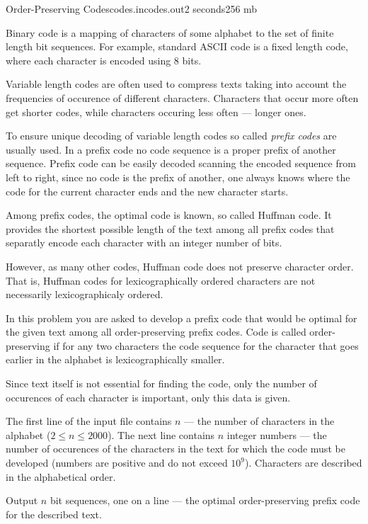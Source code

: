 \begin{problem}{Order-Preserving Codes}{codes.in}{codes.out}{2 seconds}{256 mb}


Binary code is a mapping of characters of some alphabet to the set of
finite length bit sequences. For example, standard ASCII code is a fixed 
length code, where each character is encoded using 8 bits.

Variable length codes are often used to compress texts taking
into account the frequencies of occurence of different characters.
Characters that occur more often get shorter codes, while characters
occuring less often --- longer ones.

To ensure unique decoding of variable length codes so called
\emph{prefix codes} are usually used. In a prefix code no code
sequence is a proper prefix of another sequence. Prefix code
can be easily decoded scanning the encoded sequence from left to
right, since no code is the prefix of another, one always knows
where the code for the current character ends and the new character
starts.

Among prefix codes, the optimal code is known, so called 
Huffman code. It provides the shortest possible length of the 
text among all prefix codes that separatly encode each 
character with an integer number of bits.

However, as many other codes, Huffman code does not preserve
character order. That is, Huffman codes for lexicographically ordered
characters are not necessarily lexicographicaly ordered.

In this problem you are asked to develop a prefix code
that would be optimal for the given text among all order-preserving 
prefix codes. Code is called
order-preserving if for any two characters the code sequence 
for the character that goes earlier in the alphabet is 
lexicographically smaller. 

Since text itself is not essential for finding the code,
only the number of occurences of each character is important,
only this data is given.

\InputFile

The first line of the input file contains $n$ --- the number
of characters in the alphabet ($2 \le n \le 2000$). The
next line contains $n$ integer numbers --- the number of 
occurences of the characters in the text for which the 
code must be developed (numbers are positive and do not
exceed $10^9$). Characters are described in the alphabetical 
order.

\OutputFile

Output $n$ bit sequences, one on a line --- the optimal
order-preserving prefix code for the described text.

\Example

\begin{example}
%
\end{example}

\end{problem}
